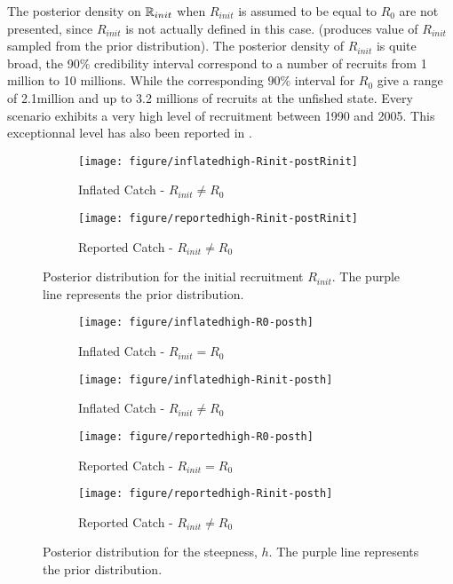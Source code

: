  The posterior density on $\mathbb{R}_{init}$ when $R_{init}$ is assumed to be equal to $R_0$ are not presented, since $R_{init}$ is not actually defined in this case. (\iscam produces value of $R_{init}$ sampled from the prior distribution).
 The posterior density of $R_{init}$ is quite broad, the 90$\%$ credibility interval correspond to a number of recruits from 1 million to 10 millions.
 While the corresponding $90\%$ interval for $R_0$ give a range of 2.1million and up to 3.2 millions of recruits at the unfished state.
 Every scenario exhibits a very high level of recruitment between 1990 and 2005. This exceptionnal  level has also been reported in \cite{tuna2012}.
 
 \begin{figure}[htbp]
 \begin{subfigure}[b]{0.45\textwidth} 
 \texttt{[image: figure/inflatedhigh-Rinit-postRinit]}
  \caption{Inflated Catch - $R_{init}\ne R_0$}
  \end{subfigure} \hfill
 \begin{subfigure}[b]{0.45\textwidth} 
 \texttt{[image: figure/reportedhigh-Rinit-postRinit]}
  \caption{Reported Catch - $R_{init}\ne R_0$}
  \end{subfigure}
  \caption{Posterior distribution for the initial recruitment $R_{init}$. The purple line represents the prior distribution.}
  \label{fig:postRinit}
 \end{figure}
 
 
 
 
 \begin{figure}[htbp]
 \begin{subfigure}[b]{0.45\textwidth}
 \texttt{[image: figure/inflatedhigh-R0-posth]}
  \caption{Inflated Catch - $R_{init}=R_0$}
  \end{subfigure} \hfill
 \begin{subfigure}[b]{0.45\textwidth} 
 \texttt{[image: figure/inflatedhigh-Rinit-posth]}
  \caption{Inflated Catch - $R_{init}\ne R_0$}
  \end{subfigure}
 \begin{subfigure}[b]{0.45\textwidth}
 \texttt{[image: figure/reportedhigh-R0-posth]}
  \caption{Reported Catch - $R_{init}=R_0$}
  \end{subfigure} \hfill
 \begin{subfigure}[b]{0.45\textwidth} 
 \texttt{[image: figure/reportedhigh-Rinit-posth]}
  \caption{Reported Catch - $R_{init}\ne R_0$}
  \end{subfigure}
  \caption{Posterior distribution for the steepness, $h$. The purple line represents the prior distribution.}
  \label{fig:posth}
 \end{figure}
 

